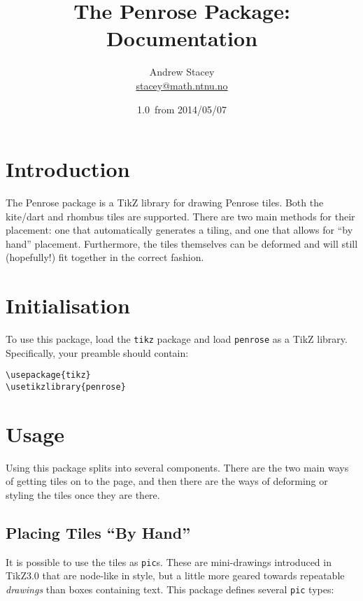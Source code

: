 \documentclass{ltxdoc}
\title{The \textsf{Penrose} Package: Documentation}
\author{Andrew Stacey \\ \url{stacey@math.ntnu.no}}
\date{1.0~from 2014/05/07}
\begin{document}
\maketitle

\section{Introduction}

The \textsf{Penrose} package is a TikZ library for drawing Penrose tiles.
Both the kite/dart and rhombus tiles are supported.
There are two main methods for their placement: one that automatically generates a tiling, and one that allows for ``by hand'' placement.
Furthermore, the tiles themselves can be deformed and will still (hopefully!) fit together in the correct fashion.

\section{Initialisation}

To use this package, load the \Verb+tikz+ package and load \Verb+penrose+ as a TikZ library.
Specifically, your preamble should contain:

\begin{verbatim}
\usepackage{tikz}
\usetikzlibrary{penrose}
\end{verbatim}

\section{Usage}

Using this package splits into several components.
There are the two main ways of getting tiles on to the page, and then there are the ways of deforming or styling the tiles once they are there.

\subsection{Placing Tiles ``By Hand''}

It is possible to use the tiles as \Verb+pic+s.
These are mini-drawings introduced in TikZ3.0 that are node-like in style, but a little more geared towards repeatable \emph{drawings} than boxes containing text.
This package defines several \Verb+pic+ types:

\end{document}
